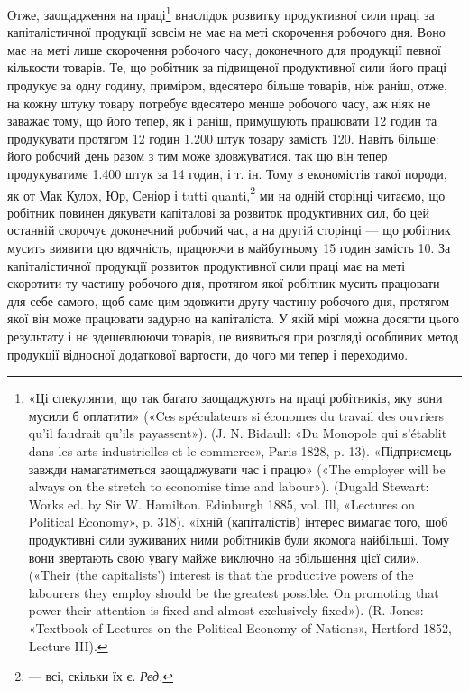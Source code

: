 Отже, заощадження на праці\footnote{
«Ці спекулянти, що так багато заощаджують на праці робітників,
яку вони мусили б оплатити» («Ces spéculateurs si économes du travail
des ouvriers qu’il faudrait qu’ils payassent»). (J. N. Bidaull: «Du
Monopole qui s’établit dans les arts industrielles et le commerce», Paris
1828, p. 13). «Підприємець завжди намагатиметься заощаджувати час і
працю» («The employer will be always on the stretch to economise
time and labour»). (Dugald Stewart: Works ed. by Sir W. Hamilton.
Edinburgh 1885, vol. Ill, «Lectures on Political Economy», p. 318). «їхній (капіталістів) інтерес
вимагає того, шоб продуктивні сили зуживаних
ними робітників були якомога найбільші. Тому вони звертають свою
увагу майже виключно на збільшення цієї сили». («Their (the capitalists’)
interest is that the productive powers of the labourers they employ should
be the greatest possible. On promoting that power their attention is fixed
and almost exclusively fixed»). (R. Jones: «Textbook of Lectures on
the Political Economy of Nations», Hertford 1852, Lecture III).
} внаслідок розвитку продуктивної сили праці за капіталістичної продукції
зовсім не має на меті
скорочення робочого дня. Воно має на меті лише скорочення робочого часу, доконечного для продукції
певної кількости товарів.
Те, що робітник за підвищеної продуктивної сили його праці
продукує за одну годину, приміром, вдесятеро більше товарів,
ніж раніш, отже, на кожну штуку товару потребує вдесятеро
менше робочого часу, аж ніяк не заважає тому, що його тепер,
як і раніш, примушують працювати 12 годин та продукувати
протягом 12 годин 1.200 штук товару замість 120. Навіть більше:
його робочий день разом з тим може здовжуватися, так що він
тепер продукуватиме 1.400 штук за 14 годин, і т. ін. Тому в економістів
такої породи, як от Мак Кулох, Юр, Сеніор і tutti
quanti,\footnote*{
— всі, скільки їх є. \emph{Ред.}
} ми на одній сторінці читаємо, що робітник повинен дякувати капіталові за розвиток
продуктивних сил, бо цей останній
скорочує доконечний робочий час, а на другій сторінці — що
робітник мусить виявити цю вдячність, працюючи в майбутньому
15 годин замість 10. За капіталістичної продукції розвиток продуктивної сили праці має на меті
скоротити ту частину робочого
дня, протягом якої робітник мусить працювати для себе самого,
щоб саме цим здовжити другу частину робочого дня, протягом
якої він може працювати задурно на капіталіста. У якій мірі
можна досягти цього результату і не здешевлюючи товарів, це
виявиться при розгляді особливих метод продукції відносної
додаткової вартости, до чого ми тепер і переходимо.
